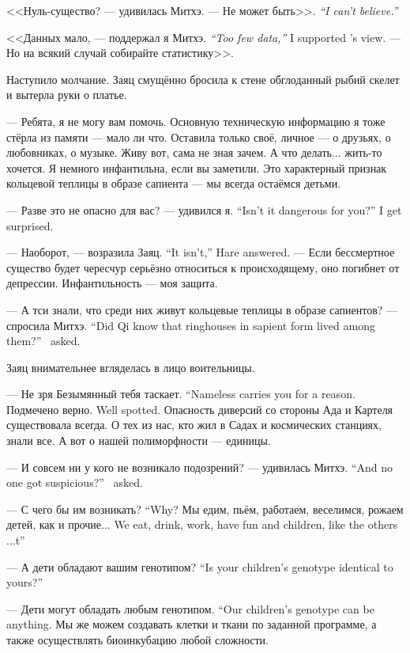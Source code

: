 <<Нуль-существо? --- удивилась Митхэ.
{--- Не может быть>>.}
{\textit{``I can't believe.''}}

{<<Данных мало, --- поддержал я Митхэ.}
{\textit{``Too few data,''} I supported \Mitchoe's view.}
--- Но на всякий случай собирайте статистику>>.

Наступило молчание.
Заяц смущённо бросила к стене обглоданный рыбий скелет и вытерла руки о платье.

--- Ребята, я не могу вам помочь.
Основную техническую информацию я тоже стёрла из памяти --- мало ли что.
Оставила только своё, личное --- о друзьях, о любовниках, о музыке.
Живу вот, сама не зная зачем.
А что делать... жить-то хочется.
Я немного инфантильна, если вы заметили.
Это характерный признак кольцевой теплицы в образе сапиента --- мы всегда остаёмся детьми.

{--- Разве это не опасно для вас? --- удивился я.}
{``Isn't it dangerous for you?'' I get surprised.}

{--- Наоборот, --- возразила Заяц.}
{``It isn't,'' Hare answered.}
--- Если бессмертное существо будет чересчур серьёзно относиться к происходящему, оно погибнет от депрессии.
Инфантильность --- моя защита.

{--- А тси знали, что среди них живут кольцевые теплицы в образе сапиентов? --- спросила Митхэ.}
{``Did Qi know that ringhouses in sapient form lived among them?'' \Mitchoe\ asked.}

Заяц внимательнее вгляделась в лицо воительницы.

{--- Не зря Безымянный тебя таскает.}
{``Nameless carries you for a reason.}
{Подмечено верно.}
{Well spotted.}
Опасность диверсий со стороны Ада и Картеля существовала всегда.
О тех из нас, кто жил в Садах и космических станциях, знали все.
А вот о нашей полиморфности --- единицы.

{--- И совсем ни у кого не возникало подозрений? --- удивилась Митхэ.}
{``And no one got suspicious?'' \Mitchoe\ asked.}

{--- С чего бы им возникать?}
{``Why?}
{Мы едим, пьём, работаем, веселимся, рожаем детей, как и прочие...}
{We eat, drink, work, have fun and children, like the others ...t''}

{--- А дети обладают вашим генотипом?}
{``Is your children's genotype identical to yours?''}

{--- Дети могут обладать любым генотипом.}
{``Our children's genotype can be anything.}
Мы же можем создавать клетки и ткани по заданной программе, а также осуществлять биоинкубацию любой сложности.


